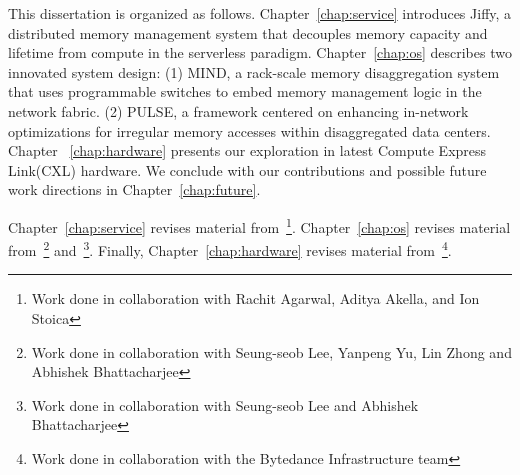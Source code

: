 This dissertation is organized as follows. Chapter~\ref{chap:service} introduces Jiffy, a distributed memory management system that decouples memory capacity and lifetime from compute in the serverless paradigm. Chapter~\ref{chap:os} describes two innovated system design: (1) MIND, a rack-scale memory disaggregation system that uses programmable switches to embed memory management logic in
the network fabric. (2) PULSE, a framework centered on enhancing in-network optimizations for
irregular memory accesses within disaggregated data centers. Chapter ~\ref{chap:hardware} presents our exploration in latest Compute Express Link(CXL) hardware. We conclude with our contributions and possible future work directions in Chapter~\ref{chap:future}.

Chapter~\ref{chap:service} revises material from~\cite{jiffy}\footnote{Work done in collaboration with Rachit Agarwal, Aditya Akella, and Ion Stoica}. Chapter~\ref{chap:os} revises material from~\cite{mind}\footnote{Work done in collaboration with Seung-seob Lee, Yanpeng Yu, Lin Zhong and Abhishek Bhattacharjee} and~\cite{chase}\footnote{Work done in collaboration with Seung-seob Lee and Abhishek Bhattacharjee}. Finally, Chapter~\ref{chap:hardware} revises material from~\cite{cxleurosys}\footnote{Work done in collaboration with the Bytedance Infrastructure team}.
